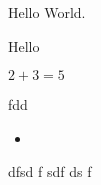 \documentclass{article}
\begin{document}
	Hello World.
	\begin{comment}
 This is a comment too.
\end{comment}
		Hello

	\begin{comment}
 And so is this one
		 ...
	
\end{comment}
	 $2+3=5$

fdd

\begin{itemize}
\item

\end{itemize}dfsd
f
sdf
ds
f
\end{document}
